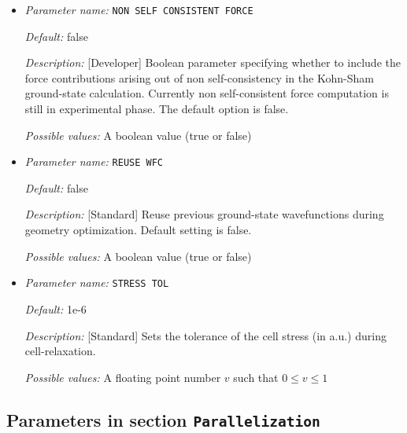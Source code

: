 \begin{itemize}
{\it Possible values:} Any string
\item {\it Parameter name:} {\tt NON SELF CONSISTENT FORCE}
\label{parameters:Geometry/Optimization/NON SELF CONSISTENT FORCE}
\label{parameters:Geometry/Optimization/NON_20SELF_20CONSISTENT_20FORCE}




{\it Default:} false


{\it Description:} [Developer] Boolean parameter specifying whether to include the force contributions arising out of non self-consistency in the Kohn-Sham ground-state calculation. Currently non self-consistent force computation is still in experimental phase. The default option is false.


{\it Possible values:} A boolean value (true or false)
\item {\it Parameter name:} {\tt REUSE WFC}
\label{parameters:Geometry/Optimization/REUSE WFC}
\label{parameters:Geometry/Optimization/REUSE_20WFC}




{\it Default:} false


{\it Description:} [Standard] Reuse previous ground-state wavefunctions during geometry optimization. Default setting is false.


{\it Possible values:} A boolean value (true or false)
\item {\it Parameter name:} {\tt STRESS TOL}
\label{parameters:Geometry/Optimization/STRESS TOL}
\label{parameters:Geometry/Optimization/STRESS_20TOL}




{\it Default:} 1e-6


{\it Description:} [Standard] Sets the tolerance of the cell stress (in a.u.) during cell-relaxation.


{\it Possible values:} A floating point number $v$ such that $0 \leq v \leq 1$
\end{itemize}

\subsection{Parameters in section \tt Parallelization}
\label{parameters:Parallelization}

